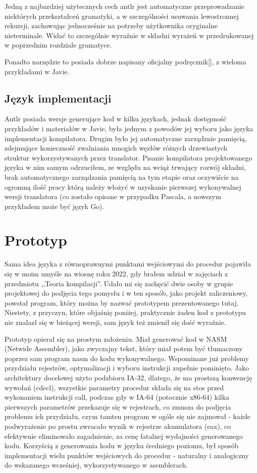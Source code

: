Jedną z najbardziej użytecznych cech antlr jest automatyczne przeprowadzanie niektórych przekształceń gramatyki, a w szczególności usuwania lewostronnej rekursji, zachowując jednocześnie na potrzeby użytkownika oryginalne nieterminale. Widać to szczególnie wyraźnie w składni wyrażeń w przedrukowanej w poprzednim rozdziale gramatyce.

Ponadto narzędzie to posiada dobrze napisany oficjalny podręcznik[], z wieloma przykładami w Javie. 
\subsection{Język implementacji}
Antlr posiada wersje generujące kod w kilku językach, jednak dostępność przykładów i materiałów w Javie, była jednym z powodów jej wyboru jako języka implementacji kompilatora. Drugim było jej automatyczne zarządznie pamięcią, zdejmujące konieczność zwalniania mnogich węzłów różnych drzewiastych struktur wykorzystywanych przez translator. Pisanie kompilatora projektowanego języka w nim samym odrzuciłem, ze względu na wciąż trwający rozwój składni, brak automatycznego zarządzania pamięcią na tym etapie oraz oczywiście na ogromną ilość pracy którą należy włożyć w uzyskanie pierwszej wykonywalnej wersji translatora (co zostało opisane w przypadku Pascala, a nowszym przykładem może być język Go).

\section{Prototyp}
Sama idea języka z równoprawnymi punktami wejściowymi do procedur pojawiła się w moim umyśle na wiosnę roku 2022, gdy brałem udział w zajęciach z przedmiotu ,,Teoria kompilacji''. Udało mi się zachęcić dwie osoby w grupie projektowej do podjęcia tego pomysłu i w ten sposób, jako projekt zaliczeniowy, powstał program, który można by nazwać prototypem prezentowanego tutaj. Niestety, z przyczyn, które objaśnię poniżej, praktycznie żaden kod z prototypu nie znalazł się w bieżącej wersji, sam język też zmienił się dość wyraźnie.

Prototyp opierał się na prostym założeniu. Miał generować kod w NASM (Netwide Assembler), jako zwyczajny tekst, który miał potem być tłumaczony poprzez sam program nasm do kodu wykonywalnego. Wspominane już problemy przydziału rejestrów, optymalizacji i wyboru instrukcji zupełnie pominięto. Jako architektury docelowej użyto podzbioru IA-32, dlatego, że ma prostszą konwencję wywołań (cdecl), wszystkie parametry procedur składa się na stos przed wykonaniem instrukcji call, podczas gdy w IA-64 (potocznie x86-64) kilka pierwszych parametrów przekazuje się w rejestrach, co zmusza do podjęcia problemu ich przydziału, czym tamten program w ogóle się nie zajmował - każde podwyrażenie po prostu zwracało wynik w rejestrze akumulatora (eax), co efektywnie eliminowało zagadnienie, za cenę fatalnej wydajności generowanego kodu. Korzyścią z generowania kodu w języku średniego poziomu, był sposób implementacji wielu punktów wejściowych do procedur - naturalny i analogiczny do wskazanego wcześniej, wykorzystywanego w asemblerach.

